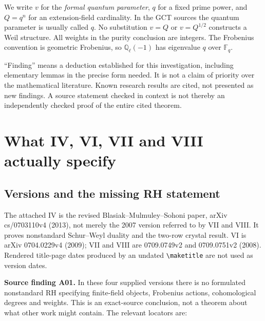 \documentclass[11pt,a4paper]{article}
\newcommand{\Q}{\mathbb Q}\newcommand{\Z}{\mathbb Z}\newcommand{\C}{\mathbb C}\newcommand{\N}{\mathbb N}\newcommand{\F}{\mathbb F}
\theoremstyle{named}\newtheorem{finding}{Finding}[section]
\theoremstyle{definition}\newtheorem{definition}[finding]{Definition}
\theoremstyle{remark}\newtheorem{remark}[finding]{Remark}
\begin{document}
We write $v$ for the \emph{formal quantum parameter}, $q$ for a fixed prime power, and $Q=q^n$ for an extension-field cardinality. In the GCT sources the quantum parameter is usually called $q$. No substitution $v=Q$ or $v=Q^{1/2}$ constructs a Weil structure. All weights in the purity conclusion are integers. The Frobenius convention is geometric Frobenius, so $\Q_\ell(-1)$ has eigenvalue $q$ over $\F_q$.

``Finding'' means a deduction established for this investigation, including elementary lemmas in the precise form needed. It is not a claim of priority over the mathematical literature. Known research results are cited, not presented as new findings. A source statement checked in context is not thereby an independently checked proof of the entire cited theorem.

\section{What IV, VI, VII and VIII actually specify}\label{sec:sources}
\subsection{Versions and the missing RH statement}
The attached IV is the revised Blasiak--Mulmuley--Sohoni paper, arXiv cs/0703110v4 (2013), not merely the 2007 version referred to by VII and VIII. It proves nonstandard Schur--Weyl duality and the two-row crystal result. VI is arXiv 0704.0229v4 (2009); VII and VIII are 0709.0749v2 and 0709.0751v2 (2008). Rendered title-page dates produced by an undated \verb|\maketitle| are not used as version dates.

\textbf{Source finding A01.} In these four supplied versions there is no formulated nonstandard RH specifying finite-field objects, Frobenius actions, cohomological degrees and weights. This is an exact-source conclusion, not a theorem about what other work might contain. The relevant locators are:
\end{document}
